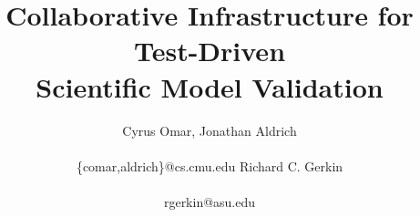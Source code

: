 \documentclass[9pt]{sig-alternate}
\begin{document}
%
\title{Collaborative Infrastructure for Test-Driven\\Scientific Model Validation}


\author{\alignauthor
Cyrus Omar, Jonathan Aldrich\\\\
       {\{comar,aldrich\}@cs.cmu.edu}
       \alignauthor Richard C. Gerkin\\
       \\{rgerkin@asu.edu}
}


% 








\maketitle
\end{document}
